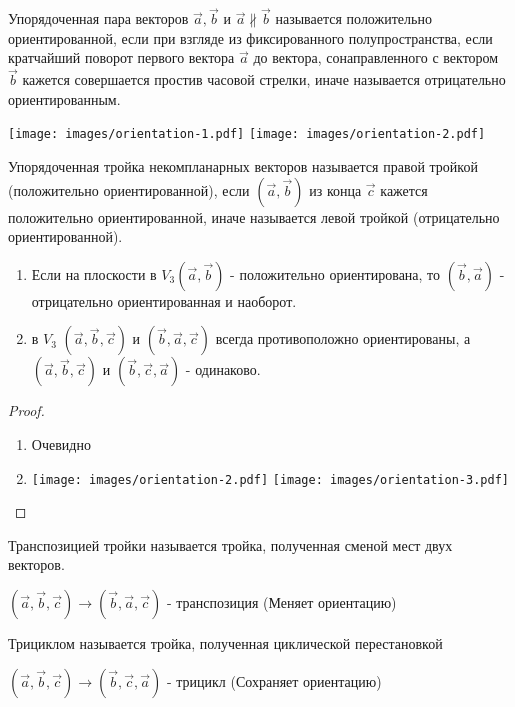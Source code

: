 \begin{definition}
	Упорядоченная пара векторов $\vec{a}, \vec{b}$ и $ \vec{a} \nparallel \vec{b}$ называется положительно ориентированной, если при взгляде из фиксированного полупространства, если кратчайший поворот первого вектора $\vec{a}$ до вектора, сонаправленного с вектором $\vec{b}$ кажется совершается простив часовой стрелки, иначе называется отрицательно ориентированным.
\end{definition}
	\vspace{.7cm}
	\texttt{[image: images/orientation-1.pdf]} \hfil	\texttt{[image: images/orientation-2.pdf]} \hfill 
	\vspace{.7cm}
\begin{definition}
	Упорядоченная тройка некомпланарных векторов называется правой тройкой (положительно ориентированной), если $(\vec{a},\vec{b})$ из конца $\vec{c}$ кажется положительно ориентированной, иначе называется левой тройкой (отрицательно ориентированной).
\end{definition}

\begin{proposition}	
	\begin{enumerate}
		\item Если на плоскости в $V_3 (\vec{a}, \vec{b})$ - положительно ориентирована, то $(\vec{b},\vec{a})$ - отрицательно ориентированная и наоборот. 
		
		\item в $V_3$ $(\vec{a},\vec{b},\vec{c})$ и $(\vec{b},\vec{a},\vec{c})$ всегда противоположно ориентированы, а $(\vec{a},\vec{b},\vec{c})$ и $(\vec{b},\vec{c},\vec{a})$ - одинаково.
	\end{enumerate}
\end{proposition}

\begin{proof}
	\begin{enumerate}
		\item Очевидно
		
		\item 
		\vspace{.7cm}
		\texttt{[image: images/orientation-2.pdf]} \hfil	\texttt{[image: images/orientation-3.pdf]} \hfill 
		\vspace{.7cm}
	\end{enumerate}
\end{proof}

\begin{definition}
	Транспозицией тройки называется тройка, полученная сменой мест двух векторов.
	
	$(\vec{a},\vec{b},\vec{c}) \rightarrow (\vec{b},\vec{a},\vec{c})$ - транспозиция (Меняет ориентацию)
	
	Трициклом называется тройка, полученная циклической перестановкой
	
	$(\vec{a},\vec{b},\vec{c}) \rightarrow (\vec{b},\vec{c},\vec{a})$ - трицикл (Сохраняет ориентацию)
\end{definition}

